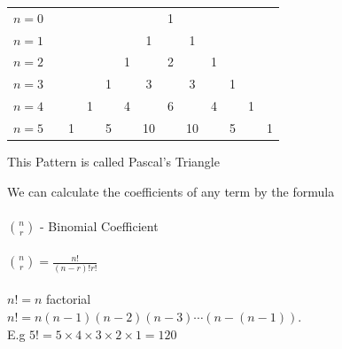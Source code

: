 \documentclass[11pt,a4paper]{article}
\theoremstyle{definition}
\begin{document}
\begin{table}[h!]
\centering
\begin{tabular}{ccccccccccccc}
$n=0$ && &&&&&1&&&&&\\
$n=1$ && &&&&1&&1&&&&\\
$n=2$ && &&&1&&2&&1&&&\\
$n=3$ && &&1&&3&&3&&1&&\\
$n=4$ && & 1& &4&&6&&4&&1&\\
$n=5$ && 1&&5&&10&&10&&5&&1\\
\end{tabular}
\end{table}

\begin{center}
This Pattern is called Pascal's Triangle
\end{center}


We can calculate the coefficients of any term by the  formula\\\\
$
\binom{n}{r}
$ - Binomial Coefficient\\\\


$
\binom{n}{r}
=\frac{n!}{(n-r)!r!}
$\\\\

$n!=n$ factorial\\
$n!=n(n-1)(n-2)(n-3)\cdots (n-(n-1)).$\\

E.g $5!=5\times 4\times 3\times 2\times 1 = 120$\\\\
\end{document}
